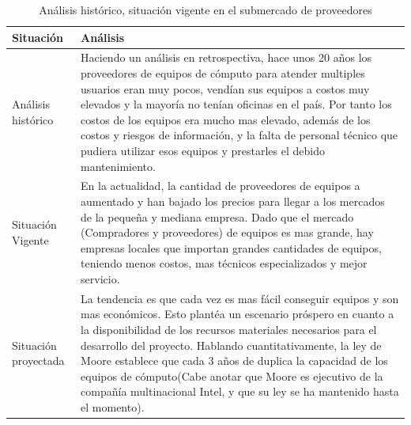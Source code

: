 \documentclass[a4paper, 12pt, oneside]{article}
\begin{document}
	\begin{table}
		\caption{Análisis histórico, situación vigente en el submercado de proveedores}
		\begin{tabular}{ | p{4cm} | p{10cm} | }
		\hline
		Situación & Análisis \\
		\hline					
		Análisis histórico & 
		Haciendo un análisis en retrospectiva, hace unos 20 años los proveedores de equipos de cómputo para atender multiples usuarios eran muy pocos, vendían sus equipos a costos muy elevados y la mayoría no tenían oficinas en el país. Por tanto los costos de los equipos era mucho mas elevado, además de los costos y riesgos de información, y la falta de personal técnico que pudiera utilizar esos equipos y prestarles el debido mantenimiento. \\
		\hline
		Situación Vigente &
		En la actualidad, la cantidad de proveedores de equipos a aumentado y han bajado los precios para llegar a los mercados de la pequeña y mediana empresa. Dado que el mercado (Compradores y proveedores) de equipos es mas grande, hay empresas locales que importan grandes cantidades de equipos, teniendo menos costos, mas técnicos especializados y mejor servicio. \\
		\hline
		Situación proyectada &
		La tendencia es que cada vez es mas fácil conseguir equipos y son mas económicos. Esto plantéa un escenario próspero en cuanto a la disponibilidad de los recursos materiales necesarios para el desarrollo del proyecto. Hablando cuantitativamente, la ley de Moore establece que cada 3 años de duplica la capacidad de los equipos de cómputo(Cabe anotar que Moore es ejecutivo de la compañía multinacional Intel, y que su ley se ha mantenido hasta el momento). \\
		\hline
		\end{tabular}
		\label{provHistorico}
	\end{table}
	
\end{document}
